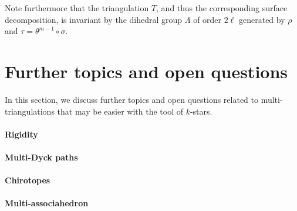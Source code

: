 \documentclass[12pt]{amsart}
\begin{document}
Note furthermore that the triangulation $T$, and thus the corresponding surface decomposition, is invariant by the dihedral group $\Lambda$ of order $2\ell$ generated by $\rho$ and $\tau=\theta^{m-1}\circ\sigma$.




\section{Further topics and open questions}\label{sectionopen}



In this section, we discuss further topics and open questions related to multi-triangulations that may be easier with the tool of $k$-stars.


\paragraph{{\sc Rigidity}}



\paragraph{{\sc Multi-Dyck paths}}


\paragraph{{\sc Chirotopes}}



\paragraph{{\sc Multi-associahedron}}



\nocite{j-gtdfssp-05}
\nocite{cp-tttccp-92}
\nocite{i-mcg-02}



\end{document}
